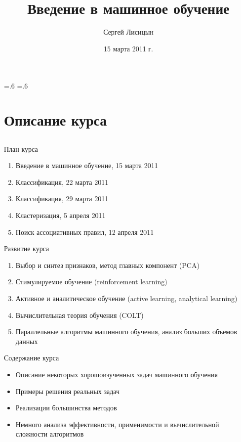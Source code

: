 \documentclass[compress,red,unicode]{beamer}
\title[Машинное обучение]{Введение в машинное обучение}
\author{Сергей Лисицын}
\institute{lisitsyn.s.o@gmail.com}
\date{15 марта 2011 г.}
\begin{document}
\section{}
\abovedisplayskip=.6\abovedisplayskip
\belowdisplayskip=.6\belowdisplayskip

\begin{frame}

\titlepage
\end{frame}
\section{Описание курса}
\subsection{}

\begin{frame}{План курса}
\begin{enumerate}
\item Введение в машинное обучение, 15 марта 2011
\item Классификация, 22 марта 2011 
\item Классификация, 29 марта 2011
\item Кластеризация, 5 апреля 2011
\item Поиск ассоциативных правил, 12 апреля 2011



\end{enumerate}
\end{frame}

\begin{frame}{Развитие курса}

\begin{enumerate}
\item Выбор и синтез признаков, метод главных компонент (PCA)
\item Стимулируемое обучение (reinforcement learning)
\item Активное и аналитическое обучение (active learning, analytical learning)
\item Вычислительная теория обучения (COLT)
\item Параллельные алгоритмы машинного обучения, анализ больших объемов данных
\end{enumerate}

\end{frame}


\begin{frame}{Содержание курса}
\begin{itemize}
	\item Описание некоторых хорошоизученных задач машинного обучения
	\item Примеры решения реальных задач
	\item Реализации большинства методов
	\item Немного анализа эффективности, применимости и вычислительной сложности алгоритмов
\end{itemize}
\end{frame}
\end{document}
